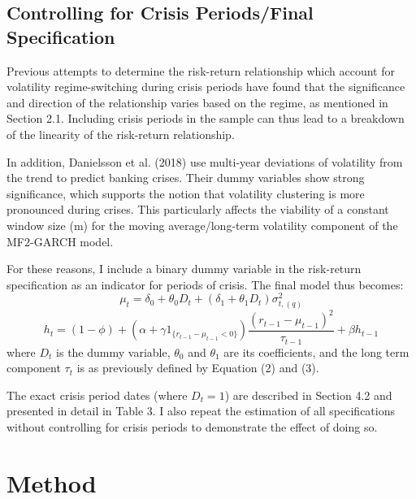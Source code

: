 \documentclass[12pt]{article}
\begin{document}
\subsection{Controlling for Crisis Periods/Final Specification}
Previous attempts to determine the risk-return relationship which account for volatility regime-switching during crisis periods have found that the significance and direction of the relationship varies based on the regime, as mentioned in Section 2.1. Including crisis periods in the sample can thus lead to a breakdown of the linearity of the risk-return relationship.\par
In addition, Danielsson et al. (2018) use multi-year deviations of volatility from the trend to predict banking crises. Their dummy variables show strong significance, which supports the notion that volatility clustering is more pronounced during crises. This particularly affects the viability of a constant window size (m) for the moving average/long-term volatility component of the MF2-GARCH model.\par
For these reasons, I include a binary dummy variable in the risk-return specification as an indicator for periods of crisis. The final model thus becomes:
\begin{equation}
\mu_t=\delta_0+\theta_0D_t+(\delta_1+\theta_1D_t)\sigma_{t,(q)}^2
\end{equation}
\begin{equation}
h_t=(1-\phi)+(\alpha+\gamma1_{\{r_{t-1}-\mu_{t-1}<0\}})\frac{(r_{t-1}-\mu_{t-1})^2}{\tau_{t-1}}+\beta h_{t-1}
\end{equation}
where $D_t$ is the dummy variable, $\theta_0$ and $\theta_1$ are its coefficients, and the long term component $\tau_t$ is as previously defined by Equation (2) and (3).\par
The exact crisis period dates (where $D_t=1$) are described in Section 4.2 and presented in detail in Table 3. I also repeat the estimation of all specifications without controlling for crisis periods to demonstrate the effect of doing so.


\section{Method}
\end{document}
